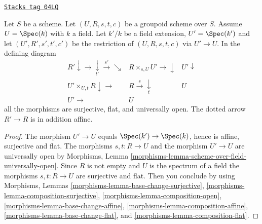 \begin{lemma}
\label{more-groupoids-lemma-restrict-groupoid-on-field}
\href{https://stacks.math.columbia.edu/tag/04LQ}{\texttt{Stacks tag 04LQ}}

Let $S$ be a scheme. Let $(U, R, s, t, c)$ be a groupoid scheme
over $S$. Assume $U = \Spec(k)$ with $k$ a field.
Let $k'/k$ be a field extension, $U' = \Spec(k')$
and let $(U', R', s', t', c')$ be the restriction of
$(U, R, s, t, c)$ via $U' \to U$. In the defining diagram
$$
\begin{array}{ccc}R' \downarrow\longrightarrow\underset{t'}{\downarrow}\overset{s'}{\longrightarrow}\searrow & R \times_{s, U} U' \longrightarrow\downarrow & U' \downarrow \\ U' \times_{U, t} R \downarrow\longrightarrow & R \overset{s}{\longrightarrow}\underset{t}{\downarrow} & U \\ U' \longrightarrow & U & \end{array}
$$
all the morphisms are surjective, flat, and universally open.
The dotted arrow $R' \to R$ is in addition affine.
\end{lemma}

\begin{proof}
The morphism $U' \to U$ equals $\Spec(k') \to \Spec(k)$,
hence is affine, surjective and flat. The morphisms $s, t : R \to U$
and the morphism $U' \to U$ are universally open by
Morphisms, Lemma \ref{morphisms-lemma-scheme-over-field-universally-open}.
Since $R$ is not empty and $U$ is the spectrum of a field the morphisms
$s, t : R \to U$ are surjective and flat. Then you conclude by using
Morphisms, Lemmas \ref{morphisms-lemma-base-change-surjective},
\ref{morphisms-lemma-composition-surjective},
\ref{morphisms-lemma-composition-open},
\ref{morphisms-lemma-base-change-affine},
\ref{morphisms-lemma-composition-affine},
\ref{morphisms-lemma-base-change-flat}, and
\ref{morphisms-lemma-composition-flat}.
\end{proof}

